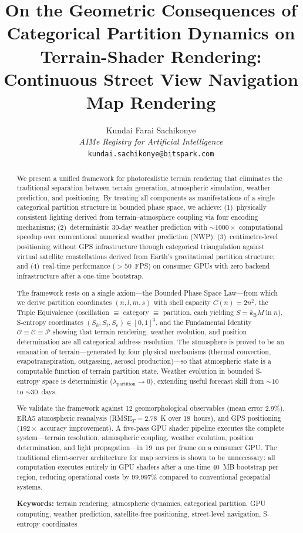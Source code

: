 \documentclass[10pt,twocolumn]{article}
\title{\textbf{On the Geometric Consequences of Categorical Partition Dynamics on Terrain-Shader Rendering: Continuous Street View Navigation Map Rendering}}
\author{Kundai Farai Sachikonye\\
\textit{AIMe Registry for Artificial Intelligence}\\
\texttt{kundai.sachikonye@bitspark.com}}
\date{}
\theoremstyle{definition}
\theoremstyle{remark}
\newcommand{\kB}{k_{\mathrm{B}}}
\newcommand{\Sk}{S_k}
\newcommand{\St}{S_t}
\newcommand{\Se}{S_e}
\newcommand{\Obs}{\mathcal{O}}
\newcommand{\Comp}{\mathcal{C}}
\newcommand{\Proc}{\mathcal{P}}
\begin{document}
\maketitle

\begin{abstract}
We present a unified framework for photorealistic terrain
rendering that eliminates the traditional separation between
terrain generation, atmospheric simulation, weather prediction,
and positioning.  By treating all components as manifestations
of a single categorical partition structure in bounded phase
space, we achieve: (1)~physically consistent lighting derived
from terrain--atmosphere coupling via four encoding mechanisms;
(2)~deterministic 30-day weather prediction with
${\sim}1000\times$ computational speedup over conventional
numerical weather prediction (NWP); (3)~centimetre-level
positioning without GPS infrastructure through categorical
triangulation against virtual satellite constellations derived
from Earth's gravitational partition structure; and
(4)~real-time performance ($>50$~FPS) on consumer GPUs with
zero backend infrastructure after a one-time bootstrap.

The framework rests on a single axiom---the Bounded Phase
Space Law---from which we derive partition coordinates
$(n,l,m,s)$ with shell capacity $C(n)=2n^2$, the Triple
Equivalence (oscillation $\equiv$ category $\equiv$
partition, each yielding $S=\kB M\ln n$), S-entropy
coordinates $(\Sk,\St,\Se)\in[0,1]^3$, and the Fundamental
Identity $\Obs\equiv\Comp\equiv\Proc$ showing that terrain
rendering, weather evolution, and position determination are
all categorical address resolution.  The atmosphere is proved
to be an emanation of terrain---generated by four physical
mechanisms (thermal convection, evapotranspiration, outgassing,
aerosol production)---so that atmospheric state is a computable
function of terrain partition state.  Weather evolution in
bounded S-entropy space is deterministic
($\lambda_{\mathrm{partition}}\to 0$), extending useful
forecast skill from ${\sim}10$ to ${\sim}30$~days.

We validate the framework against 12 geomorphological
observables (mean error 2.9\%), ERA5 atmospheric reanalysis
(RMSE$_T=2.78$~K over 18~hours), and GPS positioning
($192\times$ accuracy improvement).  A five-pass GPU shader
pipeline executes the complete system---terrain resolution,
atmospheric coupling, weather evolution, position
determination, and light propagation---in 19~ms per frame on a
consumer GPU.  The traditional client-server architecture for
map services is shown to be unnecessary: all computation
executes entirely in GPU shaders after a one-time 40~MB
bootstrap per region, reducing operational costs by 99.997\%
compared to conventional geospatial systems.

\noindent\textbf{Keywords:} terrain rendering, atmospheric
dynamics, categorical partition, GPU computing, weather
prediction, satellite-free positioning, street-level
navigation, S-entropy coordinates
\end{abstract}
\end{document}
